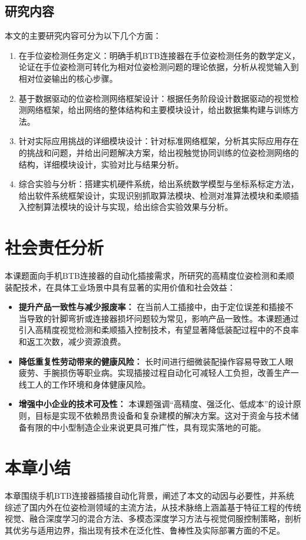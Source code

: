 \documentclass{Diploma}
\begin{document}
\subsection{研究内容}
本文的主要研究内容可分为以下几个方面：
\begin{enumerate} 
  \item 在手位姿检测任务定义：明确手机BTB连接器在手位姿检测任务的数学定义，论证在手位姿检测可转化为相对位姿检测问题的理论依据，分析从视觉输入到相对位姿输出的核心步骤。
  \item 基于数据驱动的位姿检测网络框架设计：根据任务阶段设计数据驱动的视觉检测网络框架，给出网络的整体结构和主要模块设计，给出数据集构建与训练方法。
  \item 针对实际应用挑战的详细模块设计：针对标准网络框架，分析其实际应用存在的挑战和问题，并给出问题解决方案，给出视触觉协同训练的位姿检测网络的结构，详细模块设计，实验对比与结果分析。
  \item 综合实验与分析：搭建实机硬件系统，给出系统数学模型与坐标系标定方法，给出软件系统框架设计，实现识别抓取算法模块、检测对准算法模块和柔顺插入控制算法模块的设计与实现，给出综合实验效果与分析。
\end{enumerate}
\section{社会责任分析}
本课题面向手机BTB连接器的自动化插接需求，所研究的高精度位姿检测和柔顺装配技术，在具体工业场景中具有显著的实用价值和社会效益：

\begin{itemize}
\item \textbf{提升产品一致性与减少报废率：} 在当前人工插接中，由于定位误差和插接不当导致的针脚弯折或连接器损坏问题较为常见，影响产品一致性。本课题通过引入高精度视觉检测和柔顺插入控制技术，有望显著降低装配过程中的不良率和返工次数，减少资源浪费。

\item \textbf{降低重复性劳动带来的健康风险：} 长时间进行细微装配操作容易导致工人眼疲劳、手腕损伤等职业病。实现插接过程自动化可减轻人工负担，改善生产一线工人的工作环境和身体健康风险。

\item \textbf{增强中小企业的技术可及性：} 本课题强调“高精度、强泛化、低成本”的设计原则，目标是实现不依赖昂贵设备和复杂建模的解决方案。这对于资金与技术储备有限的中小型制造企业来说更具可推广性，具有现实落地的可能。
\end{itemize}
\section{本章小结}
本章围绕手机BTB连接器插接自动化背景，阐述了本文的动因与必要性，并系统综述了国内外在位姿检测领域的主流方法，从技术脉络上涵盖基于特征工程的传统视觉、融合深度学习的混合方法、多模态深度学习方法与视觉伺服控制策略，剖析其优劣与适用边界，指出现有技术在泛化性、鲁棒性及实际部署方面的不足。
\end{document}
